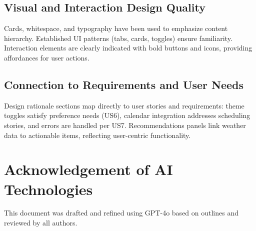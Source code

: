 \documentclass[11pt,a4paper]{article}
\begin{document}
\subsection{Visual and Interaction Design Quality}
Cards, whitespace, and typography have been used to emphasize content hierarchy. Established UI patterns (tabs, cards, toggles) ensure familiarity. Interaction elements are clearly indicated with bold buttons and icons, providing affordances for user actions.

\subsection{Connection to Requirements and User Needs}
Design rationale sections map directly to user stories and requirements: theme toggles satisfy preference needs (US6), calendar integration addresses scheduling stories, and errors are handled per US7. Recommendations panels link weather data to actionable items, reflecting user-centric functionality.

\section*{Acknowledgement of AI Technologies}
This document was drafted and refined using GPT-4o based on outlines and reviewed by all authors.
\end{document}
